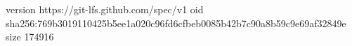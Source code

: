 version https://git-lfs.github.com/spec/v1
oid sha256:769b3019110425b5ee1a020c96fd6cfbeb0085b42b7c90a8b59c9e69af32849e
size 174916
